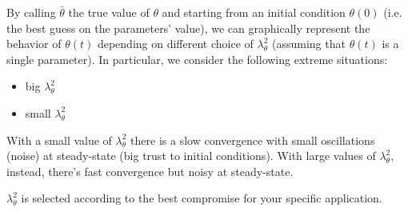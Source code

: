 By calling $\bar{\theta}$ the true value of $\theta$ and starting from an initial condition $\theta(0)$ (i.e. the best guess on the parameters' value), we can graphically represent the behavior of $\theta(t)$ depending on different choice of $\lambda_{\theta}^2$ (assuming that $\theta(t)$ is a single parameter). In particular, we consider the following extreme situations:
\begin{itemize}
    \item big $\lambda_\theta^2$
    \item small $\lambda_\theta^2$
\end{itemize}


\begin{figure}[H]
    \centering
\end{figure}

With a small value of $\lambda_\theta^2$ there is a slow convergence with small oscillations (noise) at steady-state (big trust to initial conditions).
With large values of $\lambda_\theta^2$, instead, there's fast convergence but noisy at steady-state.

$\lambda_\theta^2$ is selected according to the best compromise for your specific application.

